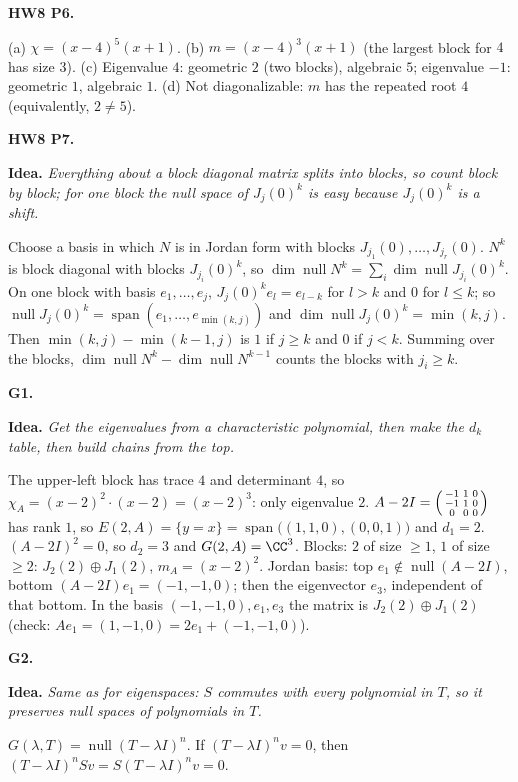 \documentclass[10pt]{scrartcl}
\DeclareMathOperator{\nul}{null}
\DeclareMathOperator{\spn}{span}
\newcommand{\idea}[1]{{\color{OliveGreen!75!black}\textbf{Idea.}} \textit{#1}\par}
\newenvironment{prob}{\par\medskip\noindent\begin{minipage}{\linewidth}\setlength{\parskip}{3pt}}{\end{minipage}\par}
\begin{document}
\begin{prob}
\textbf{HW8 P6. }\par 
(a) $\chi=(x-4)^5(x+1)$. (b) $m=(x-4)^3(x+1)$ (the largest block for $4$ has size $3$). (c) Eigenvalue $4$: geometric $2$ (two blocks), algebraic $5$; eigenvalue $-1$: geometric $1$, algebraic $1$. (d) Not diagonalizable: $m$ has the repeated root $4$ (equivalently, $2\ne5$).
\end{prob}

\begin{prob}
\textbf{HW8 P7. }\par 
\idea{Everything about a block diagonal matrix splits into blocks, so count block by block; for one block the null space of $J_j(0)^k$ is easy because $J_j(0)^k$ is a shift.}Choose a basis in which $N$ is in Jordan form with blocks $J_{j_1}(0),\dots,J_{j_r}(0)$. $N^k$ is block diagonal with blocks $J_{j_i}(0)^k$, so $\dim\nul N^k=\sum_i\dim\nul J_{j_i}(0)^k$. On one block with basis $e_1,\dots,e_j$, $J_j(0)^ke_l=e_{l-k}$ for $l>k$ and $0$ for $l\le k$; so $\nul J_j(0)^k=\spn(e_1,\dots,e_{\min(k,j)})$ and $\dim\nul J_j(0)^k=\min(k,j)$. Then $\min(k,j)-\min(k-1,j)$ is $1$ if $j\ge k$ and $0$ if $j<k$. Summing over the blocks, $\dim\nul N^k-\dim\nul N^{k-1}$ counts the blocks with $j_i\ge k$.
\end{prob}

\begin{prob}
\textbf{G1. }\par 
\idea{Get the eigenvalues from a characteristic polynomial, then make the $d_k$ table, then build chains from the top.}
The upper-left block has trace $4$ and determinant $4$, so $\chi_A=(x-2)^2\cdot(x-2)=(x-2)^3$: only eigenvalue $2$. $A-2I=\begin{psmallmatrix}-1&1&0\\-1&1&0\\0&0&0\end{psmallmatrix}$ has rank $1$, so $E(2,A)=\{y=x\}=\spn\big((1,1,0),(0,0,1)\big)$ and $d_1=2$. $(A-2I)^2=0$, so $d_2=3$ and $G(2,A)=\CC^3$. Blocks: $2$ of size $\ge1$, $1$ of size $\ge2$: $J_2(2)\oplus J_1(2)$, $m_A=(x-2)^2$. Jordan basis: top $e_1\notin\nul(A-2I)$, bottom $(A-2I)e_1=(-1,-1,0)$; then the eigenvector $e_3$, independent of that bottom. In the basis $(-1,-1,0),e_1,e_3$ the matrix is $J_2(2)\oplus J_1(2)$ (check: $Ae_1=(1,-1,0)=2e_1+(-1,-1,0)$).
\end{prob}

\begin{prob}
\textbf{G2. }\par 
\idea{Same as for eigenspaces: $S$ commutes with every polynomial in $T$, so it preserves null spaces of polynomials in $T$.}
$G(\lambda,T)=\nul(T-\lambda I)^n$. If $(T-\lambda I)^nv=0$, then $(T-\lambda I)^nSv=S(T-\lambda I)^nv=0$.
\end{prob}
\end{document}
